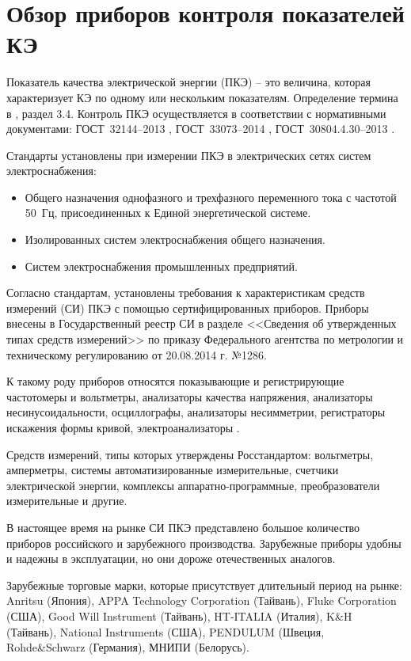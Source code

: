 \section{Обзор приборов контроля показателей КЭ} \label{sec:ch1/sec1_3} 
Показатель качества электрической энергии (ПКЭ) -- это величина, которая характеризует КЭ по одному или нескольким показателям. Определение термина в \cite{ГОСТ33073-2014}, раздел 3.4.
Контроль ПКЭ осуществляется в соответствии с нормативными документами: ГОСТ~32144--2013 \cite{ГОСТ32144-2013},  ГОСТ~33073--2014 \cite{ГОСТ33073-2014}, ГОСТ~30804.4.30--2013 \cite{ГОСТ30804.4.30-2013}. 

Стандарты установлены при измерении ПКЭ в электрических сетях систем электроснабжения:
\begin{itemize}
	\item Общего назначения однофазного и трехфазного переменного тока с частотой 50~Гц, присоединенных к Единой энергетической системе.
	\item Изолированных систем электроснабжения общего назначения.
	\item Систем электроснабжения промышленных предприятий.
\end{itemize}

Согласно стандартам, установлены требования к характеристикам средств измерений (СИ) ПКЭ с помощью сертифицированных приборов. Приборы внесены в Государственный реестр СИ в разделе <<Сведения об утвержденных типах средств измерений>> по приказу Федерального агентства по метрологии и техническому регулированию от 20.08.2014 г. №1286.

К такому роду приборов относятся показывающие и регистрирующие частотомеры и вольтметры, анализаторы качества напряжения, анализаторы несинусоидальности, осциллографы, анализаторы несимметрии, регистраторы искажения формы кривой, электроанализаторы \cite{левин1975качество}.

Средств измерений, типы которых утверждены Росстандартом: вольтметры, амперметры, системы автоматизированные измерительные, счетчики электрической энергии, комплексы аппаратно-программные, преобразователи измерительные и другие.

В настоящее время на рынке СИ ПКЭ представлено большое количество приборов российского и зарубежного производства. Зарубежные приборы удобны и надежны в эксплуатации, но они дороже отечественных аналогов.

Зарубежные торговые марки, которые присутствует длительный период на рынке: Anritsu (Япония), APPA Technology Corporation (Тайвань), Fluke Corporation (США), Good Will Instrument (Тайвань), HT-ITALIA (Италия), K\&H (Тайвань), National Instruments (США), PENDULUM (Швеция, Rohde\&Schwarz (Германия), МНИПИ (Белорусь).

